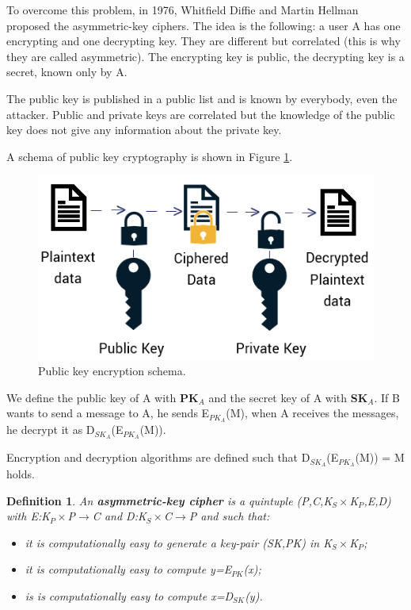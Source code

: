 \documentclass[a4paper, 12pt]{report}
\newtheorem{definition}{\textbf{Definition}}
\begin{document}
To overcome this problem, in 1976, Whitfield Diffie and Martin Hellman proposed the asymmetric-key ciphers. The idea is the following: a user A has one encrypting and one decrypting key. They are different but correlated (this is why they are called asymmetric). The encrypting key is public, the decrypting key is a secret, known only by A.

The public key is published in a public list and is known by everybody, even the attacker. Public and private keys are correlated but the knowledge of the public key does not give any information about the private key.

A schema of public key cryptography is shown in Figure \ref{fig:asymenc}. 
\begin{figure}[H]
	\centering
	\includegraphics[scale=0.65]{images/Lec11/asymenc.png}
	\caption{Public key encryption schema.}
	\label{fig:asymenc}
\end{figure}

We define the public key of A with \textbf{PK$_A$} and the secret key of A with \textbf{SK$_A$}. If B wants to send a message to A, he sends E$_{PK_A}$(M), when A receives the messages, he decrypt it as D$_{SK_A}$(E$_{PK_A}$(M)).

Encryption and decryption algorithms are defined such that D$_{SK_A}$(E$_{PK_A}$(M)) = M holds.

\begin{definition}
	An \textbf{asymmetric-key cipher} is a quintuple (P,C,K$_S\times$K$_P$,E,D) with E:K$_P\times$P$\rightarrow$C and D:K$_S\times$C$\rightarrow$P and such that:
	\begin{itemize}
		\item it is computationally easy to generate a key-pair (SK,PK) in K$_S\times$K$_P$;
		\item it is computationally easy to compute y=E$_{PK}$(x);
		\item is is computationally easy to compute x=D$_{SK}$(y).
	\end{itemize}
\end{definition}
\end{document}
